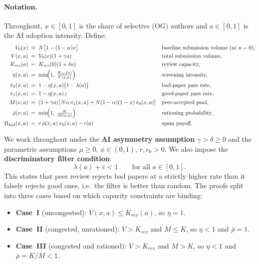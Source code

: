 \documentclass{article}
\begin{document}
\paragraph{Notation.}

Throughout, $x \in [0,1]$ is the share of selective (OG) authors and $a \in [0,1]$ is the AI adoption intensity.
Define:
\begin{align*}
  V_0(x)              &\;\equiv\; N\bigl[1-(1-\alpha)x\bigr]
    && \text{baseline submission volume (at $a=0$),}\\
  V(x,a)              &\;=\; V_0(x)(1+\gamma a)
    && \text{total submission volume,}\\
  K_{\mathit{rev}}(a) &\;=\; K_{\mathit{rev}}(0)(1+\delta a)
    && \text{review capacity,}\\
  \eta(x,a)           &\;=\; \min\!\Bigl(1,\;\tfrac{K_{\mathit{rev}}(a)}{V(x,a)}\Bigr)
    && \text{screening intensity,}\\
  \pi_0(x,a)          &\;=\; 1 - \eta(x,a)\bigl(1-\lambda(a)\bigr)
    && \text{bad-paper pass rate,}\\
  \pi_1(x,a)          &\;=\; 1 - \eta(x,a)\,\varepsilon
    && \text{good-paper pass rate,}\\
  M(x,a)              &\;=\; (1+\gamma a)\bigl[N\alpha\,\pi_1(x,a) + N(1-\alpha)(1-x)\,\pi_0(x,a)\bigr]
    && \text{peer-accepted pool,}\\
  \bar\rho(x,a)       &\;=\; \min\!\Bigl(1,\;\tfrac{K}{M(x,a)}\Bigr)
    && \text{rationing probability,}\\
  \Pi_{\mathit{bad}}(x,a) &\;=\; r\,\bar\rho(x,a)\,\pi_0(x,a) - c(a)
    && \text{spam payoff.}
\end{align*}

We work throughout under the \textbf{AI asymmetry assumption} $\gamma > \delta \geq 0$ and the parametric assumptions $\mu \geq 0$, $\phi \in (0,1)$, $r, c_0 > 0$.
We also impose the \textbf{discriminatory filter condition}:
\begin{equation}
  \label{eq:app_filter}
  \lambda(a) + \varepsilon < 1 \qquad \text{for all } a \in [0,1].
\end{equation}
This states that peer review rejects bad papers at a strictly higher rate than it falsely rejects good ones, i.e.\ the filter is better than random.
The proofs split into three cases based on which capacity constraints are binding:
\begin{itemize}
  \item \textbf{Case~I} (uncongested): $V(x,a) \leq K_{\mathit{rev}}(a)$, so $\eta = 1$.
  \item \textbf{Case~II} (congested, unrationed): $V > K_{\mathit{rev}}$ and $M \leq K$, so $\eta < 1$ and $\bar\rho = 1$.
  \item \textbf{Case~III} (congested and rationed): $V > K_{\mathit{rev}}$ and $M > K$, so $\eta < 1$ and $\bar\rho = K/M < 1$.
\end{itemize}
\end{document}
